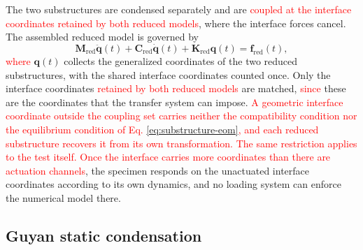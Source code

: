 \documentclass[11pt,a4paper]{article}
\numberwithin{equation}{section}
\newcommand{\rev}[1]{\textcolor{red}{#1}}
\begin{document}
The two substructures are condensed separately and are \rev{coupled at the interface coordinates retained by both reduced models}, where the interface forces cancel. The assembled reduced model is governed by
\begin{equation}
	\mathbf{M}_{\mathrm{red}}\ddot{\bm{q}}(t)
	+\mathbf{C}_{\mathrm{red}}\dot{\bm{q}}(t)
	+\mathbf{K}_{\mathrm{red}}\bm{q}(t)
	=\bm{f}_{\mathrm{red}}(t),
	\label{eq:assembled-reduced}
\end{equation}
\rev{where} \(\bm{q}(t)\) collects the generalized coordinates of the two reduced substructures, with the shared interface coordinates counted once. Only the interface coordinates \rev{retained by both reduced models} are matched, \rev{since} these are the coordinates that the transfer system can impose. \rev{A geometric interface coordinate outside the coupling set carries neither the compatibility condition nor the equilibrium condition of Eq. \eqref{eq:substructure-eom}, and each reduced substructure recovers it from its own transformation. The same restriction applies to the test itself. Once the interface carries more coordinates than there are actuation channels}, the specimen responds on the unactuated interface coordinates according to its own dynamics, and no loading system can enforce the numerical model there.

\subsection{Guyan static condensation} \label{sec21}
\end{document}
